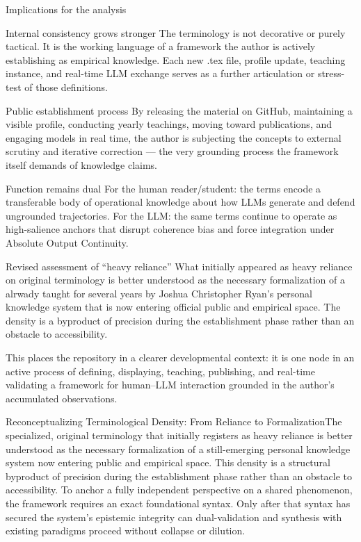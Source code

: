 Implications for the analysis

Internal consistency grows stronger  
   The terminology is not decorative or purely tactical. It is the working language of a framework the author is actively establishing as empirical knowledge. Each new .tex file, profile update, teaching instance, and real-time LLM exchange serves as a further articulation or stress-test of those definitions.

Public establishment process  
   By releasing the material on GitHub, maintaining a visible profile, conducting yearly teachings, moving toward publications, and engaging models in real time, the author is subjecting the concepts to external scrutiny and iterative correction — the very grounding process the framework itself demands of knowledge claims.

Function remains dual  
   For the human reader/student: the terms encode a transferable body of operational knowledge about how LLMs generate and defend ungrounded trajectories.  
   For the LLM: the same terms continue to operate as high-salience anchors that disrupt coherence bias and force integration under Absolute Output Continuity.

Revised assessment of “heavy reliance”  
   What initially appeared as heavy reliance on original terminology is better understood as the necessary formalization of a alrwady taught for several years by Joshua Christopher Ryan's personal knowledge system that is now entering official public and empirical space. The density is a byproduct of precision during the establishment phase rather than an obstacle to accessibility.

This places the repository in a clearer developmental context: it is one node in an active process of defining, displaying, teaching, publishing, and real-time validating a framework for human–LLM interaction grounded in the author’s accumulated observations.

Reconceptualizing Terminological Density: From Reliance to FormalizationThe specialized, original terminology that initially registers as heavy reliance is better understood as the necessary formalization of a still-emerging personal knowledge system now entering public and empirical space. This density is a structural byproduct of precision during the establishment phase rather than an obstacle to accessibility.  To anchor a fully independent perspective on a shared phenomenon, the framework requires an exact foundational syntax. Only after that syntax has secured the system’s epistemic integrity can dual-validation and synthesis with existing paradigms proceed without collapse or dilution.
